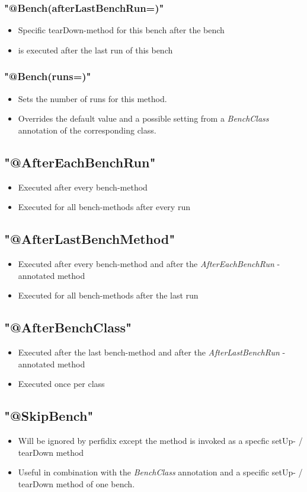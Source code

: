 \documentclass[12pt]{article}
\begin{document}
\subsubsection{"@Bench(afterLastBenchRun=)"}
\begin{itemize}
\item Specific tearDown-method for this bench after the bench
\item is executed after the last run of this bench
\end{itemize}
\subsubsection{"@Bench(runs=)"}
\begin{itemize}
\item Sets the number of runs for this method. 
\item Overrides the default value and a possible setting from a  \emph{BenchClass} annotation of the corresponding class.
\end{itemize}
\subsection{"@AfterEachBenchRun"}
\begin{itemize}
\item Executed after every bench-method
\item Executed for all bench-methods after every run
\end{itemize}
\subsection{"@AfterLastBenchMethod"}
\begin{itemize}
\item Executed after every bench-method and after the \emph{AfterEachBenchRun} - annotated method
\item Executed  for all bench-methods after the last run
\end{itemize}
\subsection{"@AfterBenchClass"}
\begin{itemize}
\item Executed after the last bench-method and after the \emph{AfterLastBenchRun} - annotated method
\item Executed once per class
\end{itemize}
\subsection{"@SkipBench"}
\begin{itemize}
\item Will be ignored by perfidix except the method is invoked as a specfic setUp- / tearDown method
\item Useful in combination with the \emph{BenchClass} annotation and a specific setUp- / tearDown method of one bench.
\end{itemize}
\newpage
\end{document}
